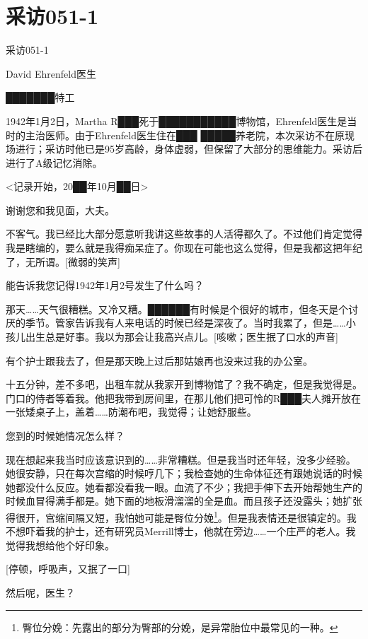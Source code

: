 \section{采访051-1}

\label{sec:DOC-interview-051-1}

采访051-1

David Ehrenfeld医生

███████特工

1942年1月2日，Martha R███死于███████████博物馆，Ehrenfeld医生是当时的主治医师。由于Ehrenfeld医生住在███ █████养老院，本次采访不在原现场进行；采访时他已是95岁高龄，身体虚弱，但保留了大部分的思维能力。采访后进行了A级记忆消除。

<记录开始，20██年10月██日>

谢谢您和我见面，大夫。

不客气。我已经比大部分愿意听我讲这些故事的人活得都久了。不过他们肯定觉得我是瞎编的，要么就是我得痴呆症了。你现在可能也这么觉得，但是我都这把年纪了，无所谓。{[}微弱的笑声]

能告诉我您记得1942年1月2号发生了什么吗？

那天……天气很糟糕。又冷又糟。██████有时候是个很好的城市，但冬天是个讨厌的季节。管家告诉我有人来电话的时候已经是深夜了。当时我累了，但是……小孩儿出生总是好事。我以为那会让我高兴点儿。{[}咳嗽；医生抿了口水的声音]

有个护士跟我去了，但是那天晚上过后那姑娘再也没来过我的办公室。

十五分钟，差不多吧，出租车就从我家开到博物馆了？我不确定，但是我觉得是。门口的侍者等着我。他把我带到房间里，在那儿他们把可怜的R███夫人摊开放在一张矮桌子上，盖着……防潮布吧，我觉得；让她舒服些。

您到的时候她情况怎么样？

现在想起来我当时应该意识到的……非常糟糕。但是我当时还年轻，没多少经验。她很安静，只在每次宫缩的时候哼几下；我检查她的生命体征还有跟她说话的时候她都没什么反应。她看都没看我一眼。血流了不少；我把手伸下去开始帮她生产的时候血冒得满手都是。她下面的地板滑溜溜的全是血。而且孩子还没露头；她扩张得很开，宫缩间隔又短，我怕她可能是臀位分娩\footnote{臀位分娩：先露出的部分为臀部的分娩，是异常胎位中最常见的一种。}。但是我表情还是很镇定的。我不想吓着我的护士，还有研究员Merrill博士，他就在旁边……一个庄严的老人。我觉得我想给他个好印象。

{[}停顿，呼吸声，又抿了一口]

然后呢，医生？

